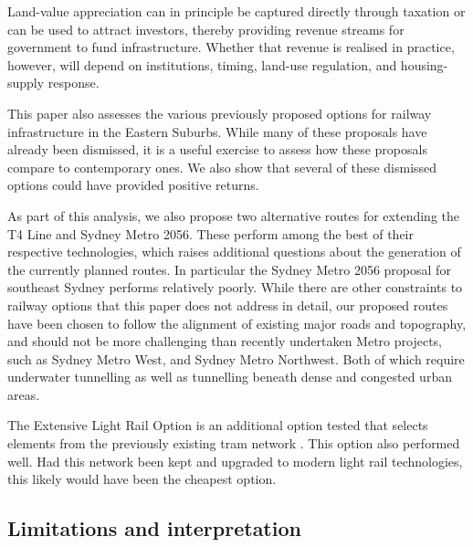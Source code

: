 \documentclass[preprint,12pt,authoryear]{elsarticle}
\begin{document}
{Land-value appreciation can in principle be captured directly through taxation or can be used to attract investors, thereby providing revenue streams for government to fund infrastructure. Whether that revenue is realised in practice, however, will depend on institutions, timing, land-use regulation, and housing-supply response.}

This paper also assesses the various previously proposed options for railway infrastructure in the Eastern Suburbs. While many of these proposals have already been dismissed, it is a useful exercise to assess how these proposals compare to contemporary ones. We also show that several of these dismissed options could have provided positive returns.



As part of this analysis, we also propose two alternative routes for extending the T4 Line and Sydney Metro 2056. These perform among the best of their respective technologies, which raises additional questions about the generation of the currently planned routes. In particular the Sydney Metro 2056 proposal for southeast Sydney performs relatively poorly. While there are other constraints to railway options that this paper does not address in detail, our proposed routes have been chosen to follow the alignment of existing major roads and topography, and should not be more challenging than recently undertaken Metro projects, such as Sydney Metro West, and Sydney Metro Northwest. Both of which require underwater tunnelling as well as tunnelling beneath dense and congested urban areas. 

The Extensive Light Rail Option is an additional option tested that selects elements from the previously existing tram network \parencite{LahoorpoorLevinson2022}. This option also performed well. Had this network been kept and upgraded to modern light rail technologies, this likely would have been the cheapest option. 

\subsection{Limitations and interpretation}
\end{document}
